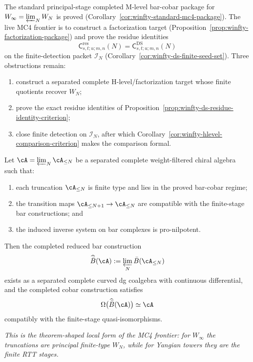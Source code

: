\begin{example}
\label{ex:winfty-completion-frontier}

The standard principal-stage completed M-level bar-cobar package for $W_\infty = \varprojlim_N W_N$ is proved (Corollary~\ref{cor:winfty-standard-mc4-package}).  The live MC4 frontier is to construct a factorization target (Proposition~\ref{prop:winfty-factorization-package}) and prove the residue identities
\[
\mathsf{C}^{\mathrm{res}}_{s,t;u;m,n}(N)
=\mathsf{C}^{\mathrm{DS}}_{s,t;u;m,n}(N)
\]
on the finite-detection packet $\mathcal{I}_N$ (Corollary~\ref{cor:winfty-ds-finite-seed-set}).  Three obstructions remain:
\begin{enumerate}
\item construct a separated complete H-level/factorization target whose finite quotients recover $W_N$;
\item prove the exact residue identities of Proposition~\ref{prop:winfty-ds-residue-identity-criterion};
\item close finite detection on $\mathcal{I}_N$, after which Corollary~\ref{cor:winfty-hlevel-comparison-criterion} makes the comparison formal.
\end{enumerate}
\end{example}

\begin{conjecture}
\label{conj:inverse-limit-completed-bar-cobar}
Let $\cA = \varprojlim_N \cA_{\le N}$ be a separated complete
weight-filtered chiral algebra such that:
\begin{enumerate}
\item each truncation $\cA_{\le N}$ is finite type and lies in the
  proved bar-cobar regime;
\item the transition maps $\cA_{\le N+1} \to \cA_{\le N}$ are compatible
  with the finite-stage bar constructions; and
\item the induced inverse system on bar complexes is pro-nilpotent.
\end{enumerate}
Then the completed reduced bar construction
\[
\widehat{\bar B}(\cA) := \varprojlim_N \bar B(\cA_{\le N})
\]
exists as a separated complete curved dg coalgebra with continuous
differential, and the completed cobar construction satisfies
\[
\Omega\bigl(\widehat{\bar B}(\cA)\bigr) \simeq \cA
\]
compatibly with the finite-stage quasi-isomorphisms.

\emph{This is the theorem-shaped local form of the MC4 frontier:
for $W_\infty$ the truncations are principal finite-type $W_N$, while
for Yangian towers they are the finite RTT stages.}
\end{conjecture}

